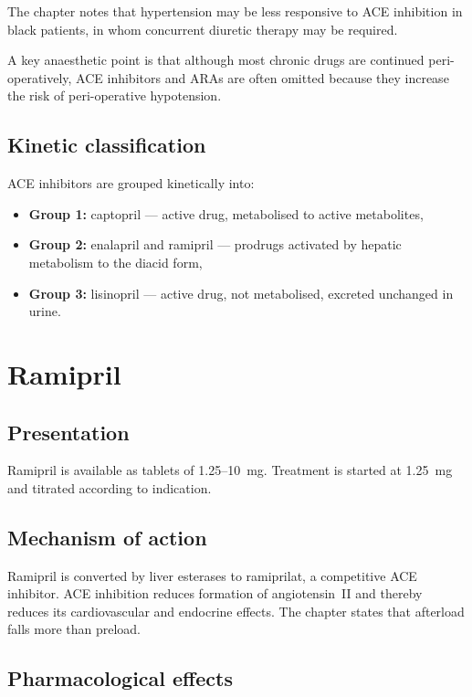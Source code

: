 \documentclass[11pt,a4paper]{article}
\begin{document}
The chapter notes that hypertension may be less responsive to ACE inhibition in black patients, in whom concurrent diuretic therapy may be required.

A key anaesthetic point is that although most chronic drugs are continued peri-operatively, ACE inhibitors and ARAs are often omitted because they increase the risk of peri-operative hypotension.

\subsection{Kinetic classification}

ACE inhibitors are grouped kinetically into:
\begin{itemize}
    \item \textbf{Group 1:} captopril --- active drug, metabolised to active metabolites,
    \item \textbf{Group 2:} enalapril and ramipril --- prodrugs activated by hepatic metabolism to the diacid form,
    \item \textbf{Group 3:} lisinopril --- active drug, not metabolised, excreted unchanged in urine.
\end{itemize}

\section{Ramipril}

\subsection{Presentation}

Ramipril is available as tablets of 1.25--10~mg. Treatment is started at 1.25~mg and titrated according to indication.

\subsection{Mechanism of action}

Ramipril is converted by liver esterases to ramiprilat, a competitive ACE inhibitor. ACE inhibition reduces formation of angiotensin~II and thereby reduces its cardiovascular and endocrine effects. The chapter states that afterload falls more than preload.

\subsection{Pharmacological effects}
\end{document}
